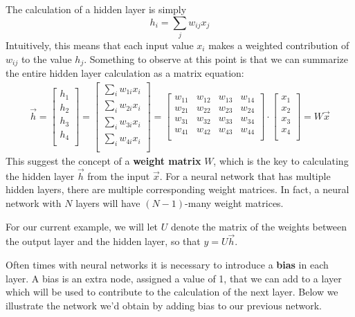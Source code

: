 \documentclass[12pt,letterpaper]{book}
\theoremstyle{definition}
\begin{document}
  The calculation of a hidden layer is simply 
  \[
      h_i = \sum_{j}w_{ij}x_j
  \]  
  Intuitively, this means that each input value $x_i$ makes a weighted contribution of $w_{ij}$ 
  to the value $h_j$. Something to observe at this point is that we can summarize the entire hidden layer 
  calculation as a matrix equation:
  \begin{align}
    \vec{h}=
    \begin{bmatrix}
      h_{1} \\
      h_{2} \\
      h_{3} \\
      h_{4} \\
    \end{bmatrix}
    = \begin{bmatrix}
      \sum_{i}w_{1i}x_i \\
      \sum_{i}w_{2i}x_i \\
      \sum_{i}w_{3i}x_i \\
      \sum_{i}w_{4i}x_i \\
    \end{bmatrix}
    = \begin{bmatrix}
      w_{11} & w_{12} & w_{13} & w_{14}\\
      w_{21} & w_{22} & w_{23} & w_{24}\\
      w_{31} & w_{32} & w_{33} & w_{34}\\
      w_{41} & w_{42} & w_{43} & w_{44}\\
    \end{bmatrix}
    \cdot
    \begin{bmatrix}
      x_{1} \\
      x_{2} \\
      x_{3} \\
      x_{4} \\
    \end{bmatrix}
    = 
    W\vec{x}
  \end{align}
  This suggest the concept of a \textbf{weight matrix} $W$, which is the key to calculating the 
  hidden layer $\vec{h}$ from the input $\vec{x}$. For a neural network that has 
  multiple hidden layers, there are multiple corresponding weight matrices. In fact, 
  a neural network with $N$ layers will have $(N-1)$-many weight matrices. 

  For our current example, we will let $U$ denote the matrix of 
  the weights between the output layer and the hidden layer, so that 
  $y = U\vec{h}$. 

  Often times with neural networks it is necessary to introduce a \textbf{bias} in each layer.   
  A bias is an extra node, assigned a value of 1, that we can add to a layer 
  which will be used to contribute to the calculation of the next layer. Below we illustrate the network 
  we'd obtain by adding bias to our previous network.
\end{document}
